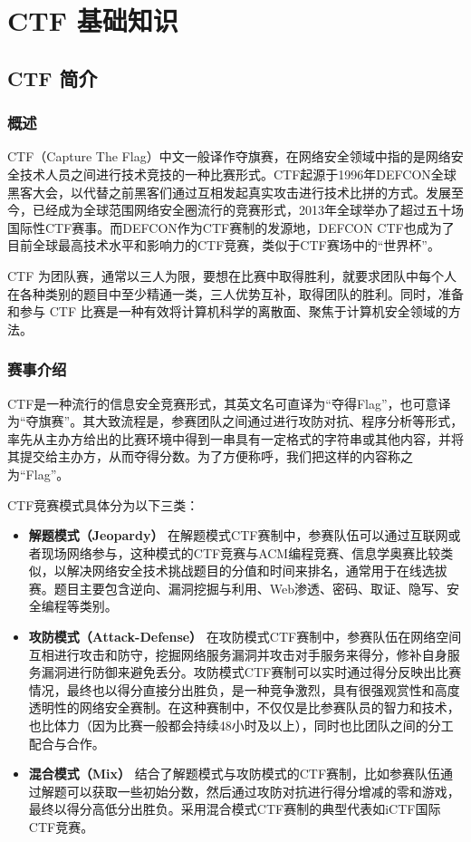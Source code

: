 \usepackage{minted}
\chapter{CTF 基础知识}
\section{CTF 简介}
\subsection{概述}
\indent \setlength{\parindent}{2em}
\indent CTF（Capture The Flag）中文一般译作夺旗赛，在网络安全领域中指的是网络安全技术人员之间进行技术竞技的一种比赛形式。CTF起源于1996年DEFCON全球黑客大会，以代替之前黑客们通过互相发起真实攻击进行技术比拼的方式。发展至今，已经成为全球范围网络安全圈流行的竞赛形式，2013年全球举办了超过五十场国际性CTF赛事。而DEFCON作为CTF赛制的发源地，DEFCON CTF也成为了目前全球最高技术水平和影响力的CTF竞赛，类似于CTF赛场中的“世界杯”。

\indent CTF 为团队赛，通常以三人为限，要想在比赛中取得胜利，就要求团队中每个人在各种类别的题目中至少精通一类，三人优势互补，取得团队的胜利。同时，准备和参与 CTF 比赛是一种有效将计算机科学的离散面、聚焦于计算机安全领域的方法。

\subsection{赛事介绍}
\indent \setlength{\parindent}{2em}

\indent CTF是一种流行的信息安全竞赛形式，其英文名可直译为“夺得Flag”，也可意译为“夺旗赛”。其大致流程是，参赛团队之间通过进行攻防对抗、程序分析等形式，率先从主办方给出的比赛环境中得到一串具有一定格式的字符串或其他内容，并将其提交给主办方，从而夺得分数。为了方便称呼，我们把这样的内容称之为“Flag”。

\indent CTF竞赛模式具体分为以下三类：
\begin{itemize}
    \item \textbf{解题模式（Jeopardy）} 
    \indent 在解题模式CTF赛制中，参赛队伍可以通过互联网或者现场网络参与，这种模式的CTF竞赛与ACM编程竞赛、信息学奥赛比较类似，以解决网络安全技术挑战题目的分值和时间来排名，通常用于在线选拔赛。题目主要包含逆向、漏洞挖掘与利用、Web渗透、密码、取证、隐写、安全编程等类别。
    
    \item \textbf{攻防模式（Attack-Defense）}
    \indent 在攻防模式CTF赛制中，参赛队伍在网络空间互相进行攻击和防守，挖掘网络服务漏洞并攻击对手服务来得分，修补自身服务漏洞进行防御来避免丢分。攻防模式CTF赛制可以实时通过得分反映出比赛情况，最终也以得分直接分出胜负，是一种竞争激烈，具有很强观赏性和高度透明性的网络安全赛制。在这种赛制中，不仅仅是比参赛队员的智力和技术，也比体力（因为比赛一般都会持续48小时及以上），同时也比团队之间的分工配合与合作。
    
    \item \textbf{混合模式（Mix）}
    \indent 结合了解题模式与攻防模式的CTF赛制，比如参赛队伍通过解题可以获取一些初始分数，然后通过攻防对抗进行得分增减的零和游戏，最终以得分高低分出胜负。采用混合模式CTF赛制的典型代表如iCTF国际CTF竞赛。
\end{itemize}


